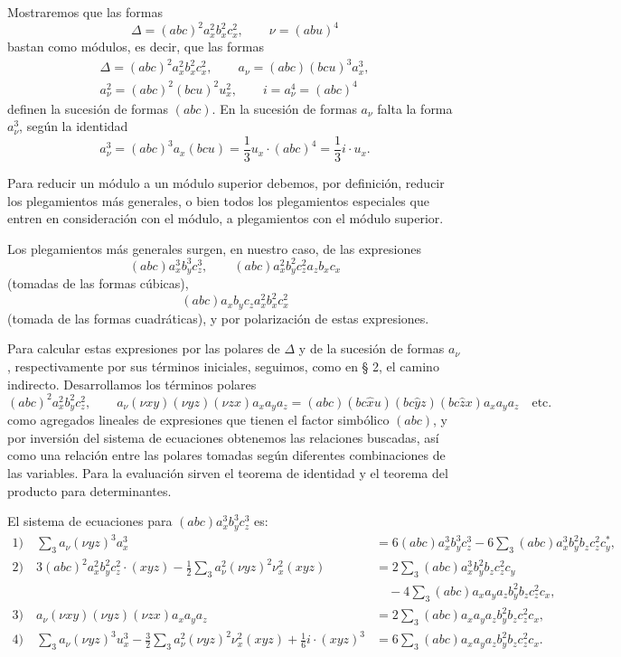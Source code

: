 \documentclass[11pt]{article}
\newcommand{\A}{\Delta}
\begin{document}
Mostraremos que las formas
\[
\A=(abc)^2a_x^2b_x^2c_x^2,\qquad \nu=(abu)^4
\]
bastan como módulos, es decir, que las formas
\[
\begin{gathered}
\A=(abc)^2a_x^2b_x^2c_x^2,\qquad
a_\nu=(abc)(bcu)^3a_x^3,\\
a_\nu^2=(abc)^2(bcu)^2u_x^2,\qquad
i=a_\nu^4=(abc)^4
\end{gathered}
\]
definen la sucesión de formas $(abc)$. En la sucesión de formas $a_\nu$ falta la forma $a_\nu^3$, según la identidad
\[
a_\nu^3=(abc)^3a_x(bcu)=\frac13 u_x\cdot(abc)^4=\frac13 i\cdot u_x.
\]

Para reducir un módulo a un módulo superior debemos, por definición, reducir los plegamientos más generales, o bien todos los plegamientos especiales que entren en consideración con el módulo, a plegamientos con el módulo superior.

Los plegamientos más generales surgen, en nuestro caso, de las expresiones
\[
(abc)a_x^3b_y^3c_z^3,\qquad
(abc)a_x^2b_y^2c_z^2a_zb_xc_x
\]
(tomadas de las formas cúbicas),
\[
(abc)a_xb_yc_za_x^2b_x^2c_x^2
\]
(tomada de las formas cuadráticas), y por polarización de estas expresiones.

Para calcular estas expresiones por las polares de $\A$ y de la sucesión de formas $a_\nu$, respectivamente por sus términos iniciales, seguimos, como en § 2, el camino indirecto. Desarrollamos los términos polares
\[
(abc)^2a_x^2b_y^2c_z^2,\qquad
a_\nu(\nu xy)(\nu yz)(\nu zx)a_xa_ya_z
=(abc)(bc\widehat{x}u)(bc\widehat{y}z)(bc\widehat{z}x)a_xa_ya_z\quad\text{etc.}
\]
como agregados lineales de expresiones que tienen el factor simbólico $(abc)$, y por inversión del sistema de ecuaciones obtenemos las relaciones buscadas, así como una relación entre las polares tomadas según diferentes combinaciones de las variables. Para la evaluación sirven el teorema de identidad y el teorema del producto para determinantes.

El sistema de ecuaciones para $(abc)a_x^3b_y^3c_z^3$ es:
\begingroup\small
\[
\begin{aligned}
1)\quad
\sum_3 a_\nu(\nu yz)^3a_x^3
&=6(abc)a_x^3b_y^3c_z^3
-6\sum_3(abc)a_x^3b_y^2b_zc_z^2c_y^{*},\\[0.4em]
2)\quad
3(abc)^2a_x^2b_y^2c_z^2\cdot(xyz)
-\frac12\sum_3 a_\nu^2(\nu yz)^2\nu_x^2(xyz)
&=2\sum_3(abc)a_x^3b_y^2b_zc_z^2c_y\\
&\quad-4\sum_3(abc)a_xa_ya_zb_y^2b_zc_z^2c_x,\\[0.4em]
3)\quad
a_\nu(\nu xy)(\nu yz)(\nu zx)a_xa_ya_z
&=2\sum_3(abc)a_xa_ya_zb_y^2b_zc_z^2c_x,\\[0.4em]
4)\quad
\sum_3 a_\nu(\nu yz)^3u_x^3
-\frac32\sum_3 a_\nu^2(\nu yz)^2\nu_x^2(xyz)
+\frac16 i\cdot(xyz)^3
&=6\sum_3(abc)a_xa_ya_zb_y^2b_zc_z^2c_x.
\end{aligned}
\]
\endgroup
\end{document}

